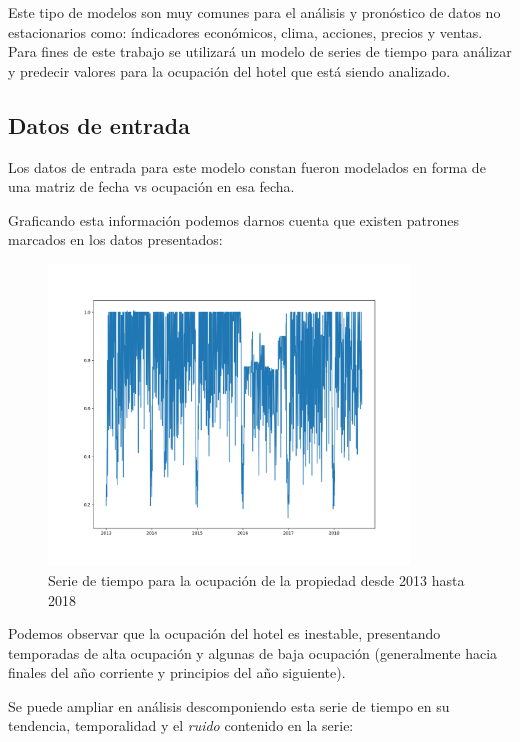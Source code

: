 Este tipo de modelos son muy comunes para el análisis y pronóstico de datos no estacionarios como: índicadores económicos, clima, acciones, precios y ventas. Para fines de este trabajo se utilizará un modelo de series de tiempo para análizar y predecir valores para la ocupación del hotel que está siendo analizado.

\subsection*{Datos de entrada}

Los datos de entrada para este modelo constan fueron modelados en forma de una matriz de fecha vs ocupación en esa fecha.

Graficando esta información podemos darnos cuenta que existen patrones marcados en los datos presentados:

\begin{figure}[H]
  \centering
      \includegraphics[width=\maxwidth,height=8cm]{figures/TsOcc.png}    
  \caption{Serie de tiempo para la ocupación de la propiedad desde 2013 hasta 2018}
\end{figure}

Podemos observar que la ocupación del hotel es inestable, presentando temporadas de alta ocupación y algunas de baja ocupación (generalmente hacia finales del año corriente y principios del año siguiente).

Se puede ampliar en análisis descomponiendo esta serie de tiempo en su tendencia, temporalidad y el \emph{ruido} contenido en la serie:

